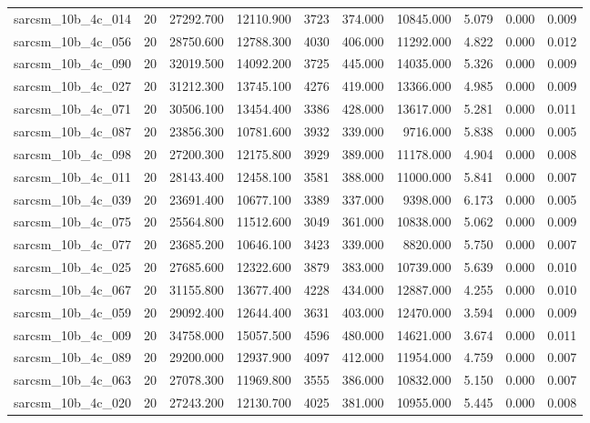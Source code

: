 \begin{tabular}{lrrrrrrrrr}
sarcsm\_10b\_4c\_014 & 20 & 27292.700 & 12110.900 & 3723 & 374.000 & 10845.000 & 5.079 & 0.000 & 0.009 \\
sarcsm\_10b\_4c\_056 & 20 & 28750.600 & 12788.300 & 4030 & 406.000 & 11292.000 & 4.822 & 0.000 & 0.012 \\
sarcsm\_10b\_4c\_090 & 20 & 32019.500 & 14092.200 & 3725 & 445.000 & 14035.000 & 5.326 & 0.000 & 0.009 \\
sarcsm\_10b\_4c\_027 & 20 & 31212.300 & 13745.100 & 4276 & 419.000 & 13366.000 & 4.985 & 0.000 & 0.009 \\
sarcsm\_10b\_4c\_071 & 20 & 30506.100 & 13454.400 & 3386 & 428.000 & 13617.000 & 5.281 & 0.000 & 0.011 \\
sarcsm\_10b\_4c\_087 & 20 & 23856.300 & 10781.600 & 3932 & 339.000 & 9716.000 & 5.838 & 0.000 & 0.005 \\
sarcsm\_10b\_4c\_098 & 20 & 27200.300 & 12175.800 & 3929 & 389.000 & 11178.000 & 4.904 & 0.000 & 0.008 \\
sarcsm\_10b\_4c\_011 & 20 & 28143.400 & 12458.100 & 3581 & 388.000 & 11000.000 & 5.841 & 0.000 & 0.007 \\
sarcsm\_10b\_4c\_039 & 20 & 23691.400 & 10677.100 & 3389 & 337.000 & 9398.000 & 6.173 & 0.000 & 0.005 \\
sarcsm\_10b\_4c\_075 & 20 & 25564.800 & 11512.600 & 3049 & 361.000 & 10838.000 & 5.062 & 0.000 & 0.009 \\
sarcsm\_10b\_4c\_077 & 20 & 23685.200 & 10646.100 & 3423 & 339.000 & 8820.000 & 5.750 & 0.000 & 0.007 \\
sarcsm\_10b\_4c\_025 & 20 & 27685.600 & 12322.600 & 3879 & 383.000 & 10739.000 & 5.639 & 0.000 & 0.010 \\
sarcsm\_10b\_4c\_067 & 20 & 31155.800 & 13677.400 & 4228 & 434.000 & 12887.000 & 4.255 & 0.000 & 0.010 \\
sarcsm\_10b\_4c\_059 & 20 & 29092.400 & 12644.400 & 3631 & 403.000 & 12470.000 & 3.594 & 0.000 & 0.009 \\
sarcsm\_10b\_4c\_009 & 20 & 34758.000 & 15057.500 & 4596 & 480.000 & 14621.000 & 3.674 & 0.000 & 0.011 \\
sarcsm\_10b\_4c\_089 & 20 & 29200.000 & 12937.900 & 4097 & 412.000 & 11954.000 & 4.759 & 0.000 & 0.007 \\
sarcsm\_10b\_4c\_063 & 20 & 27078.300 & 11969.800 & 3555 & 386.000 & 10832.000 & 5.150 & 0.000 & 0.007 \\
sarcsm\_10b\_4c\_020 & 20 & 27243.200 & 12130.700 & 4025 & 381.000 & 10955.000 & 5.445 & 0.000 & 0.008 \\

\end{tabular}
